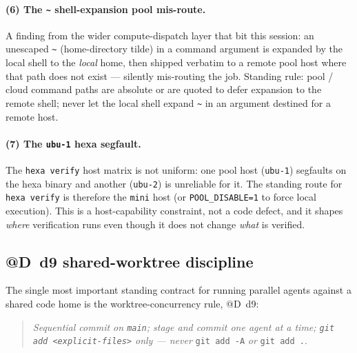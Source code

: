\paragraph{(6) The \texttt{\textasciitilde{}} shell-expansion pool mis-route.}
A finding from the wider compute-dispatch layer that bit this session:
an unescaped \texttt{\textasciitilde{}} (home-directory tilde) in a
command argument is expanded by the local shell to the \emph{local}
home, then shipped verbatim to a remote pool host where that path does
not exist --- silently mis-routing the job. Standing rule: pool / cloud
command paths are absolute or are quoted to defer expansion to the
remote shell; never let the local shell expand \texttt{\textasciitilde{}}
in an argument destined for a remote host.

\paragraph{(7) The \texttt{ubu-1} hexa segfault.}
The \texttt{hexa verify} host matrix is not uniform: one pool host
(\texttt{ubu-1}) segfaults on the hexa binary and another (\texttt{ubu-2})
is unreliable for it. The standing route for \texttt{hexa verify} is
therefore the \texttt{mini} host (or \texttt{POOL\_DISABLE=1} to force
local execution). This is a host-capability constraint, not a code
defect, and it shapes \emph{where} verification runs even though it does
not change \emph{what} is verified.

\subsection{@D~d9 shared-worktree discipline}
\label{app:operational:d9}

The single most important standing contract for running parallel agents
against a shared code home is the worktree-concurrency rule, @D~d9:

\begin{quote}
\emph{Sequential commit on \texttt{main}; stage and commit one agent at a
time; \texttt{git add <explicit-files>} only --- never} \verb|git add -A|
\emph{or} \verb|git add .|.
\end{quote}


